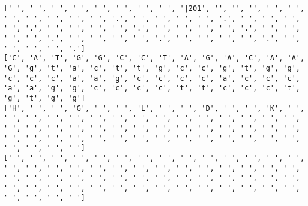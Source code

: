 \documentclass{article}
\begin{document}
\begin{Verbatim}
[' ', ' ', ' ', ' ', ' ', ' ', ' ', ' ', '|201', '', '', '', ' ', ' ', ' ', ' ', ' ', ' ', ' ', '.', ' ', ' ', ' ', ' ', '.', ' ', ' ', ' ', ' ', '.', ' ', ' ', ' ', ' ', '.', ' ', ' ', ' ', ' ', '.', ' ', ' ', ' ', ' ', '.', ' ', ' ', ' ', ' ', '.', ' ', ' ', ' ', ' ', '.', ' ', ' ', ' ', ' ', '.']
['C', 'A', 'T', 'G', 'G', 'C', 'C', 'T', 'A', 'G', 'A', 'C', 'A', 'A', 'G', 'g', 't', 'a', 'c', 't', 't', 'g', 'c', 'c', 'g', 't', 'g', 'g', 'c', 'c', 'c', 'a', 'a', 'g', 'c', 'c', 'c', 'c', 'a', 'c', 'c', 'c', 'a', 'a', 'g', 'g', 'c', 'c', 'c', 'c', 't', 't', 'c', 'c', 'c', 't', 'g', 't', 'g', 'g']
['H', ' ', ' ', 'G', ' ', ' ', 'L', ' ', ' ', 'D', ' ', ' ', 'K', ' ', ' ', ' ', ' ', ' ', ' ', ' ', ' ', ' ', ' ', ' ', ' ', ' ', ' ', ' ', ' ', ' ', ' ', ' ', ' ', ' ', ' ', ' ', ' ', ' ', ' ', ' ', ' ', ' ', ' ', ' ', ' ', ' ', ' ', ' ', ' ', ' ', ' ', ' ', ' ', ' ', ' ', ' ', ' ', ' ', ' ', ' ']
[' ', ' ', ' ', ' ', ' ', ' ', ' ', ' ', ' ', ' ', ' ', ' ', ' ', ' ', ' ', ' ', ' ', ' ', ' ', ' ', ' ', ' ', ' ', ' ', ' ', ' ', ' ', ' ', ' ', ' ', ' ', ' ', ' ', ' ', ' ', ' ', ' ', ' ', ' ', ' ', ' ', ' ', ' ', ' ', ' ', ' ', ' ', ' ', ' ', ' ', ' ', ' ', ' ', ' ', ' ', ' ', ' ', ' ', ' ', ' ']
  

\end{Verbatim}
\end{document}
